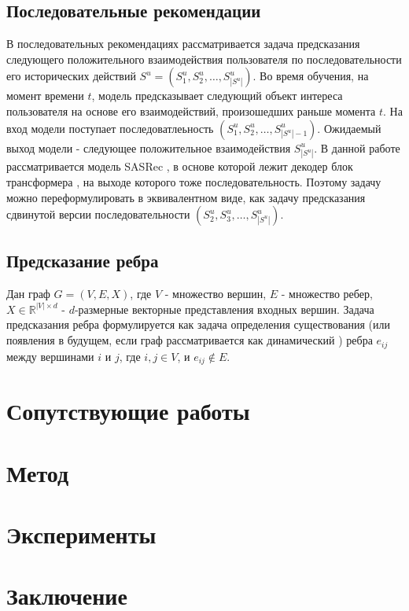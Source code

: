 \documentclass{article}
\begin{document}
\subsection{Последовательные рекомендации}
В последовательных рекомендациях рассматривается задача предсказания следующего положительного взаимодействия 
пользователя по последовательности его исторических действий $S^u = (S_1^u, S_2^u, \dots, S_{|S^u|}^u)$.
Во время обучения, на момент времени $t$, модель предсказывает следующий объект интереса пользователя на основе его
взаимодействий, произошедших раньше момента $t$. На вход модели поступает последоватлеьность
$(S_1^u, S_2^u, \dots, S^u_{|S^u| - 1})$. Ожидаемый выход модели - следующее положительное взаимодействия $S^u_{|S^u|}$. 
В данной работе рассматривается модель SASRec \citep{sasrec}, в основе которой лежит декодер блок трансформера \cite{transformer},
на выходе которого тоже последовательность. 
Поэтому задачу можно переформулировать в эквивалентном виде, как задачу предсказания сдвинутой версии 
последовательности $(S_2^u, S_3^u, \dots, S^u_{|S^u|})$.

\subsection{Предсказание ребра}

Дан граф $G = (V, E, X)$, где $V$ - множество вершин, $E$ - множество ребер, $X \in \mathbb{R}^{|V| \times d}$
- $d$-размерные векторные представления входных вершин. Задача предсказания ребра формулируется как задача
определения существования (или появления в будущем, если граф рассматривается как динамический \cite{dyngnn}) ребра $e_{ij}$
между вершинами $i$ и $j$, где $i, j \in V$, и $e_{ij} \not \in E$.

\section{Сопутствующие работы}



\section{Метод}

\section{Эксперименты}

\section{Заключение}



\end{document}
